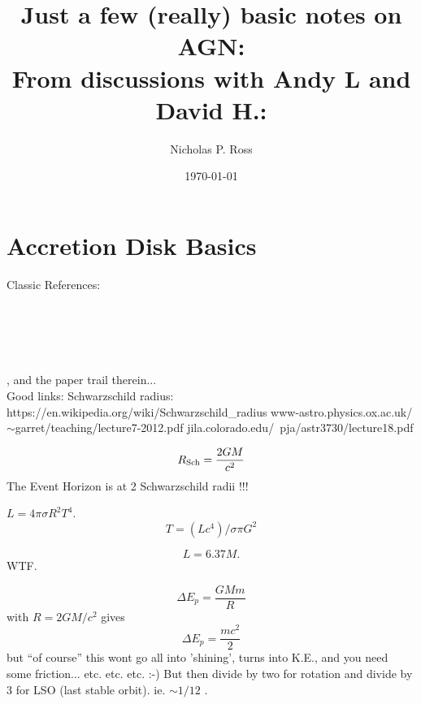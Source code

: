 \documentclass[11pt]{article}
\begin{document}
\title{Just a few (really) basic notes on AGN: \\
From discussions with Andy L and David H.:}
\author{Nicholas P. Ross}
\date{\today}
\maketitle





\section{Accretion Disk Basics}
Classic References:\\
\citet{SS73}\\
\citet{Pringle81}\\
\citet{Pringle81}\\
\citet{Richards06b}\\
\citet{Kishimoto08}\\
\citet{Lawrence12}, and the paper trail therein...\\

Good links:
Schwarzschild radius: https://en.wikipedia.org/wiki/Schwarzschild\_radius
www-astro.physics.ox.ac.uk/$\sim$garret/teaching/lecture7-2012.pdf
jila.colorado.edu/~pja/astr3730/lecture18.pdf

\begin{equation}
     R_{\rm Sch} = \frac{2GM}{c^2}
\end{equation}
The Event Horizon is at 2 Schwarzschild radii !!!

$L = 4\pi \sigma  R^2 T^4$. 
\begin{equation}
T = (L c^4) / \sigma \pi G^{2} 
\end{equation}


\begin{equation}
  L = 6.37 M. 
\end{equation}
WTF. 

\begin{equation}
  \Delta E_{p} = \frac{G M m}{R} 
\end{equation}
with $R=2GM/c^2$ gives
\begin{equation}
    \Delta E_{p} = \frac{mc^2}{2}
\end{equation}
but ``of course'' this wont go all into 'shining', turns into K.E., 
and you need some friction... etc. etc. etc. :-) 
But then divide by two for rotation and divide by 3 for LSO (last stable orbit). 
ie. $\sim 1/12$ . 
\end{document}
